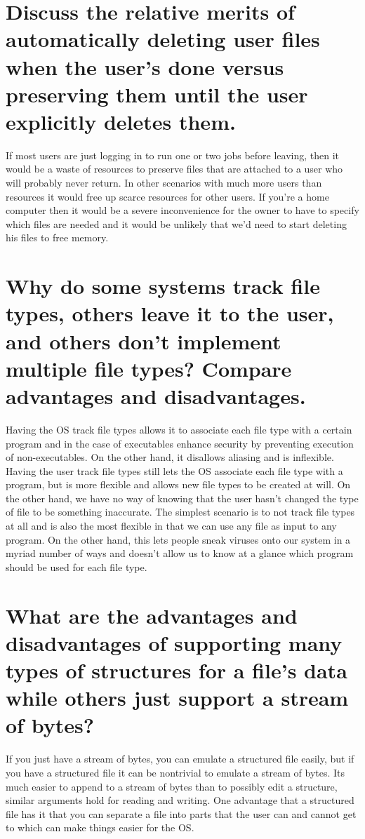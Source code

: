 \documentclass{book}%
\begin{document}
\section{Discuss the relative merits of automatically deleting user files when the user's done versus preserving them until the user explicitly deletes them.}
If most users are just logging in to run one or two jobs before leaving, then it would be a waste of resources to preserve files that are attached to a user who will probably never return. In other scenarios with much more users than resources it would free up scarce resources for other users. If you're a home computer then it would be a severe inconvenience for the owner to have to specify which files are needed and it would be unlikely that we'd need to start deleting his files to free memory.
\section{Why do some systems track file types, others leave it to the user, and others don't implement multiple file types? Compare advantages and disadvantages.}
Having the OS track file types allows it to associate each file type with a certain program and in the case of executables enhance security by preventing execution of non-executables. On the other hand, it disallows aliasing and is inflexible. Having the user track file types still lets the OS associate each file type with a program, but is more flexible and allows new file types to be created at will. On the other hand, we have no way of knowing that the user hasn't changed the type of file to be something inaccurate. The simplest scenario is to not track file types at all and is also the most flexible in that we can use any file as input to any program. On the other hand, this lets people sneak viruses onto our system in a myriad number of ways and doesn't allow us to know at a glance which program should be used for each file type.
\section{What are the advantages and disadvantages of supporting many types of structures for a file's data while others just support a stream of bytes? }
If you just have a stream of bytes, you can emulate a structured file easily, but if you have a structured file it can be nontrivial to emulate a stream of bytes. Its much easier to append to a stream of bytes than to possibly edit a structure, similar arguments hold for reading and writing. One advantage that a structured file has it that you can separate a file into parts that the user can and cannot get to which can make things easier for the OS.
\end{document}
